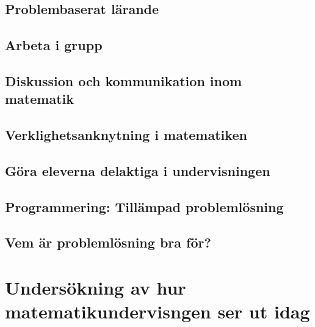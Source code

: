 \documentclass[11pt,a4paper]{article}
\begin{document}
    \subsection{Problembaserat lärande}
        \label{sec:pbl}
        
        
    \subsection{Arbeta i grupp}
        \label{sec:Arbetaigrupp}
        
        
    \subsection{Diskussion och kommunikation inom matematik}
        
        \label{sec:Diskussion}
        
    \subsection{Verklighetsanknytning i matematiken}
        \label{sec:Verklighetsanknytning}
        
        
    \subsection{Göra eleverna delaktiga i undervisningen}
        
        \label{sec:delaktighet}
        
    \subsection{Programmering: Tillämpad problemlösning}
        \label{sec:ProgrammeringOchMatematik}
        
        
    \subsection{Vem är problemlösning bra för?}
        
    
\section{Undersökning av hur matematikundervisngen ser ut idag}
    
    
\end{document}
